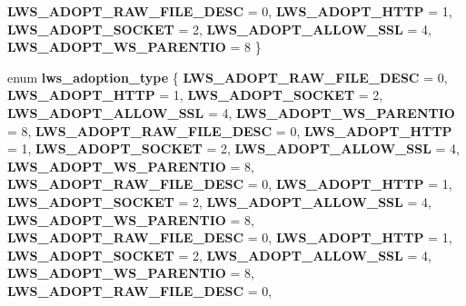 \begin{DoxyCompactItemize}
{\bfseries L\+W\+S\+\_\+\+A\+D\+O\+P\+T\+\_\+\+R\+A\+W\+\_\+\+F\+I\+L\+E\+\_\+\+D\+E\+SC} = 0, 
{\bfseries L\+W\+S\+\_\+\+A\+D\+O\+P\+T\+\_\+\+H\+T\+TP} = 1, 
{\bfseries L\+W\+S\+\_\+\+A\+D\+O\+P\+T\+\_\+\+S\+O\+C\+K\+ET} = 2, 
\newline
{\bfseries L\+W\+S\+\_\+\+A\+D\+O\+P\+T\+\_\+\+A\+L\+L\+O\+W\+\_\+\+S\+SL} = 4, 
{\bfseries L\+W\+S\+\_\+\+A\+D\+O\+P\+T\+\_\+\+W\+S\+\_\+\+P\+A\+R\+E\+N\+T\+IO} = 8
 \}
\item 
\mbox{\label{group__sock-adopt_ga7e944a23efbb50187d34c62fb841d071}} 
enum {\bfseries lws\+\_\+adoption\+\_\+type} \{ \newline
{\bfseries L\+W\+S\+\_\+\+A\+D\+O\+P\+T\+\_\+\+R\+A\+W\+\_\+\+F\+I\+L\+E\+\_\+\+D\+E\+SC} = 0, 
{\bfseries L\+W\+S\+\_\+\+A\+D\+O\+P\+T\+\_\+\+H\+T\+TP} = 1, 
{\bfseries L\+W\+S\+\_\+\+A\+D\+O\+P\+T\+\_\+\+S\+O\+C\+K\+ET} = 2, 
{\bfseries L\+W\+S\+\_\+\+A\+D\+O\+P\+T\+\_\+\+A\+L\+L\+O\+W\+\_\+\+S\+SL} = 4, 
\newline
{\bfseries L\+W\+S\+\_\+\+A\+D\+O\+P\+T\+\_\+\+W\+S\+\_\+\+P\+A\+R\+E\+N\+T\+IO} = 8, 
{\bfseries L\+W\+S\+\_\+\+A\+D\+O\+P\+T\+\_\+\+R\+A\+W\+\_\+\+F\+I\+L\+E\+\_\+\+D\+E\+SC} = 0, 
{\bfseries L\+W\+S\+\_\+\+A\+D\+O\+P\+T\+\_\+\+H\+T\+TP} = 1, 
{\bfseries L\+W\+S\+\_\+\+A\+D\+O\+P\+T\+\_\+\+S\+O\+C\+K\+ET} = 2, 
\newline
{\bfseries L\+W\+S\+\_\+\+A\+D\+O\+P\+T\+\_\+\+A\+L\+L\+O\+W\+\_\+\+S\+SL} = 4, 
{\bfseries L\+W\+S\+\_\+\+A\+D\+O\+P\+T\+\_\+\+W\+S\+\_\+\+P\+A\+R\+E\+N\+T\+IO} = 8, 
{\bfseries L\+W\+S\+\_\+\+A\+D\+O\+P\+T\+\_\+\+R\+A\+W\+\_\+\+F\+I\+L\+E\+\_\+\+D\+E\+SC} = 0, 
{\bfseries L\+W\+S\+\_\+\+A\+D\+O\+P\+T\+\_\+\+H\+T\+TP} = 1, 
\newline
{\bfseries L\+W\+S\+\_\+\+A\+D\+O\+P\+T\+\_\+\+S\+O\+C\+K\+ET} = 2, 
{\bfseries L\+W\+S\+\_\+\+A\+D\+O\+P\+T\+\_\+\+A\+L\+L\+O\+W\+\_\+\+S\+SL} = 4, 
{\bfseries L\+W\+S\+\_\+\+A\+D\+O\+P\+T\+\_\+\+W\+S\+\_\+\+P\+A\+R\+E\+N\+T\+IO} = 8, 
{\bfseries L\+W\+S\+\_\+\+A\+D\+O\+P\+T\+\_\+\+R\+A\+W\+\_\+\+F\+I\+L\+E\+\_\+\+D\+E\+SC} = 0, 
\newline
{\bfseries L\+W\+S\+\_\+\+A\+D\+O\+P\+T\+\_\+\+H\+T\+TP} = 1, 
{\bfseries L\+W\+S\+\_\+\+A\+D\+O\+P\+T\+\_\+\+S\+O\+C\+K\+ET} = 2, 
{\bfseries L\+W\+S\+\_\+\+A\+D\+O\+P\+T\+\_\+\+A\+L\+L\+O\+W\+\_\+\+S\+SL} = 4, 
{\bfseries L\+W\+S\+\_\+\+A\+D\+O\+P\+T\+\_\+\+W\+S\+\_\+\+P\+A\+R\+E\+N\+T\+IO} = 8, 
\newline
{\bfseries L\+W\+S\+\_\+\+A\+D\+O\+P\+T\+\_\+\+R\+A\+W\+\_\+\+F\+I\+L\+E\+\_\+\+D\+E\+SC} = 0, 

\end{DoxyCompactItemize}
